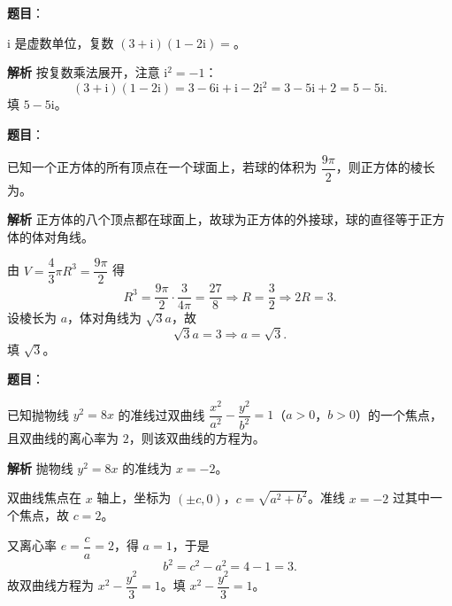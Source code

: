 \begin{answer}

\textbf{题目}：

$\mathrm i$ 是虚数单位，复数 $(3+\mathrm i)(1-2\mathrm i)=$\gkblank{}。

\textbf{解析}
按复数乘法展开，注意 $\mathrm i^2=-1$：
\nopagebreak[4]
\[(3+\mathrm i)(1-2\mathrm i)=3-6\mathrm i+\mathrm i-2\mathrm i^2=3-5\mathrm i+2=5-5\mathrm i.\]
填 $5-5\mathrm i$。


\end{answer}
\begin{answer}

\textbf{题目}：

已知一个正方体的所有顶点在一个球面上，若球的体积为 $\dfrac{9\pi}2$，则正方体的棱长为\gkblank{}。

\textbf{解析}
正方体的八个顶点都在球面上，故球为正方体的外接球，球的直径等于正方体的体对角线。

由 $V=\dfrac43\pi R^3=\dfrac{9\pi}2$ 得
\nopagebreak[4]
\[R^3=\frac{9\pi}2\cdot\frac3{4\pi}=\frac{27}8\Longrightarrow R=\frac32\Longrightarrow 2R=3.\]
设棱长为 $a$，体对角线为 $\sqrt3a$，故
\nopagebreak[4]
\[\sqrt3a=3\Longrightarrow a=\sqrt3.\]
填 $\sqrt3$。


\end{answer}
\begin{answer}

\textbf{题目}：

已知抛物线 $y^2=8x$ 的准线过双曲线 $\dfrac{x^2}{a^2}-\dfrac{y^2}{b^2}=1$（$a>0$，$b>0$）的一个焦点，且双曲线的离心率为 $2$，则该双曲线的方程为\gkblank{}。

\textbf{解析}
抛物线 $y^2=8x$ 的准线为 $x=-2$。

双曲线焦点在 $x$ 轴上，坐标为 $(\pm c,0)$，$c=\sqrt{a^2+b^2}$。准线 $x=-2$ 过其中一个焦点，故 $c=2$。

又离心率 $e=\dfrac ca=2$，得 $a=1$，于是
\nopagebreak[4]
\[b^2=c^2-a^2=4-1=3.\]
故双曲线方程为 $x^2-\dfrac{y^2}3=1$。填 $x^2-\dfrac{y^2}3=1$。


\end{answer}
